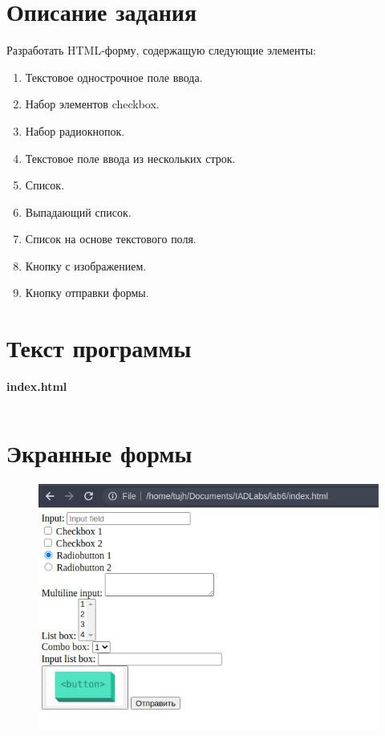 \documentclass[20pt,a4paper]{report}
\begin{document}
	\chapter{Описание задания}
		\large
		\qquad Разработать HTML-форму, содержащую следующие элементы: \\
		\begin{enumerate}
			\item Текстовое однострочное поле ввода.
			\item Набор элементов checkbox.
			\item Набор радиокнопок.
			\item Текстовое поле ввода из нескольких строк.
			\item Список.
			\item Выпадающий список.
			\item Список на основе текстового поля.
			\item Кнопку с изображением.
			\item Кнопку отправки формы.
		\end{enumerate}

	\chapter{Текст программы}
		\qquad \textbf{index.html} \\
		\small
		\inputminted[tabsize=4, linenos]{html}{index.html}
		\large
		
	\chapter{Экранные формы}
		\begin{figure}[H]
			\includegraphics[width=\textwidth]{1.png}
		\end{figure}
\end{document}
